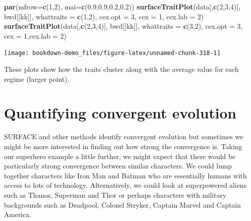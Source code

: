 \documentclass[
]{book}
\newenvironment{Shaded}{\begin{snugshade}}{\end{snugshade}}
\newcommand{\DataTypeTok}[1]{\textcolor[rgb]{0.13,0.29,0.53}{#1}}
\newcommand{\DecValTok}[1]{\textcolor[rgb]{0.00,0.00,0.81}{#1}}
\newcommand{\FloatTok}[1]{\textcolor[rgb]{0.00,0.00,0.81}{#1}}
\newcommand{\KeywordTok}[1]{\textcolor[rgb]{0.13,0.29,0.53}{\textbf{#1}}}
\newcommand{\NormalTok}[1]{#1}
\begin{document}
\begin{Shaded}
\begin{Highlighting}[]
\KeywordTok{par}\NormalTok{(}\DataTypeTok{mfrow=}\KeywordTok{c}\NormalTok{(}\DecValTok{1}\NormalTok{,}\DecValTok{2}\NormalTok{), }\DataTypeTok{mai=}\KeywordTok{c}\NormalTok{(}\FloatTok{0.9}\NormalTok{,}\FloatTok{0.9}\NormalTok{,}\FloatTok{0.2}\NormalTok{,}\FloatTok{0.2}\NormalTok{))}
\KeywordTok{surfaceTraitPlot}\NormalTok{(data[,}\KeywordTok{c}\NormalTok{(}\DecValTok{2}\NormalTok{,}\DecValTok{3}\NormalTok{,}\DecValTok{4}\NormalTok{)], bwd[[kk]], }\DataTypeTok{whattraits =} \KeywordTok{c}\NormalTok{(}\DecValTok{1}\NormalTok{,}\DecValTok{2}\NormalTok{),}
                 \DataTypeTok{cex.opt =} \DecValTok{3}\NormalTok{, }\DataTypeTok{cex =} \DecValTok{1}\NormalTok{, }\DataTypeTok{cex.lab =} \DecValTok{2}\NormalTok{)}
\KeywordTok{surfaceTraitPlot}\NormalTok{(data[,}\KeywordTok{c}\NormalTok{(}\DecValTok{2}\NormalTok{,}\DecValTok{3}\NormalTok{,}\DecValTok{4}\NormalTok{)], bwd[[kk]], }\DataTypeTok{whattraits =} \KeywordTok{c}\NormalTok{(}\DecValTok{3}\NormalTok{,}\DecValTok{2}\NormalTok{),  }
                 \DataTypeTok{cex.opt =} \DecValTok{3}\NormalTok{, }\DataTypeTok{cex =} \DecValTok{1}\NormalTok{,}\DataTypeTok{cex.lab =} \DecValTok{2}\NormalTok{)}
\end{Highlighting}
\end{Shaded}

\begin{center}\texttt{[image: bookdown-demo\_files/figure-latex/unnamed-chunk-318-1]} \end{center}

These plots show how the traits cluster along with the average value for each regime (larger point).

\hypertarget{quantifying-convergent-evolution}{%
\section{Quantifying convergent evolution}\label{quantifying-convergent-evolution}}

SURFACE and other methods identify convergent evolution but sometimes we might be more interested in finding out how strong the convergence is. Taking our superhero example a little further, we might expect that there would be particularly strong convergence between similar characters. We could lump together characters like Iron Man and Batman who are essentially humans with access to lots of technology. Alternatively, we could look at superpowered aliens such as Thanos, Superman and Thor or perhaps characters with military backgrounds such as Deadpool, Colonel Stryker, Captain Marvel and Captain America.
\end{document}
